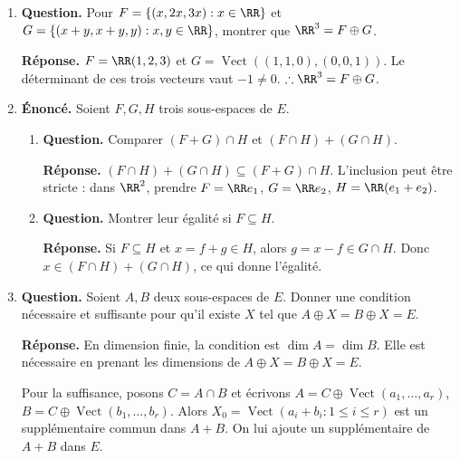 \documentclass[12pt, a4paper]{article}
\begin{document}
\begin{enumerate}[label=6.\arabic*., start=105]
  \item \begin{minipage}[t]{\linewidth}\raggedright
\textbf{Question.} Pour $F=\{(x,2x,3x):x\in\RR\}$ et $G=\{(x+y,x+y,y):x,y\in\RR\}$, montrer que $\RR^3=F\oplus G$.
\par\smallskip
\textbf{Réponse.} $F=\RR(1,2,3)$ et $G=\operatorname{Vect}((1,1,0),(0,0,1))$.
    Le déterminant de ces trois vecteurs vaut $-1\neq0$.
    $\therefore\RR^3=F\oplus G$.
\end{minipage}

  \item \begin{minipage}[t]{\linewidth}\raggedright
\textbf{Énoncé.} Soient $F,G,H$ trois sous-espaces de $E$.

\begin{enumerate}[\arabic*.]
        \item \textbf{Question.} Comparer $(F+G)\cap H$ et $(F\cap H)+(G\cap H)$.
\par\smallskip
\textbf{Réponse.} $(F\cap H)+(G\cap H)\subseteq(F+G)\cap H$.
        L'inclusion peut être stricte : dans $\RR^2$, prendre $F=\RR e_1$, $G=\RR e_2$, $H=\RR(e_1+e_2)$.

  \item \textbf{Question.} Montrer leur égalité si $F\subseteq H$.
\par\smallskip
\textbf{Réponse.} Si $F\subseteq H$ et $x=f+g\in H$, alors $g=x-f\in G\cap H$.
        Donc $x\in(F\cap H)+(G\cap H)$, ce qui donne l'égalité.

\end{enumerate}
\end{minipage}

  \item \begin{minipage}[t]{\linewidth}\raggedright
\textbf{Question.} Soient $A,B$ deux sous-espaces de $E$. Donner une condition nécessaire et suffisante pour qu’il existe $X$ tel que $A\oplus X=B\oplus X=E$.
\par\smallskip
\textbf{Réponse.} En dimension finie, la condition est $\dim A=\dim B$.
    Elle est nécessaire en prenant les dimensions de $A\oplus X=B\oplus X=E$.

    Pour la suffisance, posons $C=A\cap B$ et écrivons
    $A=C\oplus\operatorname{Vect}(a_1,\ldots,a_r)$,
    $B=C\oplus\operatorname{Vect}(b_1,\ldots,b_r)$.
    Alors $X_0=\operatorname{Vect}(a_i+b_i:1\leq i\leq r)$ est un supplémentaire commun dans $A+B$.
    On lui ajoute un supplémentaire de $A+B$ dans $E$.


\end{minipage}
\end{enumerate}
\end{document}
